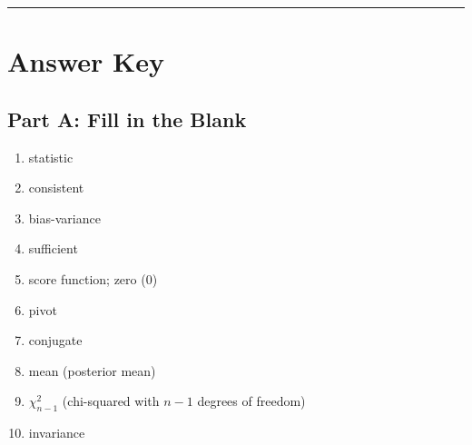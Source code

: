 \documentclass[11pt]{article}
\begin{document}
\vspace{2.5in}

\bigskip
\hrule
\bigskip

\newpage
\section*{Answer Key}

\subsection*{Part A: Fill in the Blank}
\begin{enumerate}
\item statistic
\item consistent
\item bias-variance
\item sufficient
\item score function; zero (0)
\item pivot
\item conjugate
\item mean (posterior mean)
\item $\chi^2_{n-1}$ (chi-squared with $n-1$ degrees of freedom)
\item invariance
\end{enumerate}
\end{document}

